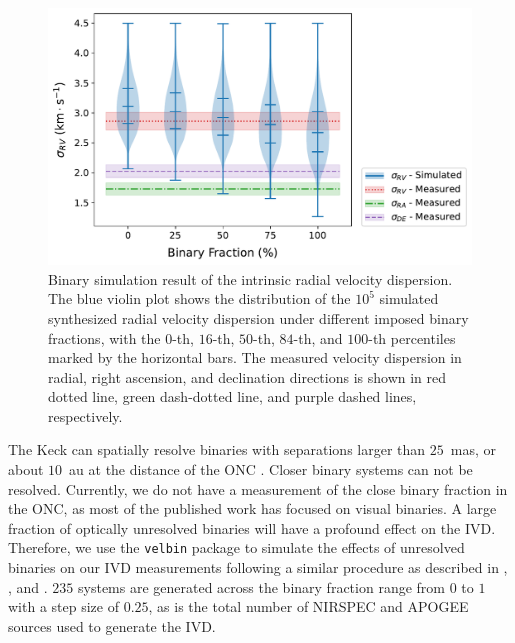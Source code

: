\documentclass[12pt]{ucsddissertation}
\begin{document}
\begin{CJK*}{UTF8}{gbsn}
\begin{figure}[htb!]
    \centering
    \includegraphics[width=\linewidth]{figures/chapter1/Binary_Simulation_Violin.pdf}
    \caption[Violin plot of the intrinsic radial velocity dispersion in binary simulation]{Binary simulation result of the intrinsic radial velocity dispersion. The blue violin plot shows the distribution of the $10^5$ simulated synthesized radial velocity dispersion under different imposed binary fractions, with the $0$-th, $16$-th, $50$-th, $84$-th, and $100$-th percentiles marked by the horizontal bars. The measured velocity dispersion in radial, right ascension, and declination directions is shown in red dotted line, green dash-dotted line, and purple dashed lines, respectively.}
    \label{fig:binary violin}
\end{figure}

The Keck can spatially resolve binaries with separations larger than $25$~mas, or about $10$~au at the distance of the ONC \citep{Lacour-2011}. Closer binary systems can not be resolved. Currently, we do not have a measurement of the close binary fraction in the ONC, as most of the published work has focused on visual binaries.  A large fraction of optically unresolved binaries will have a profound effect on the IVD. Therefore, we use the \texttt{velbin} package \citep[][]{Cottaar-2014, Foster-2015} to simulate the effects of unresolved binaries on our IVD measurements following a similar procedure as described in \citet{DaRio-2017}, \citet{Karnath-2019}, and . $235$ systems are generated across the binary fraction range from $0$ to $1$ with a step size of $0.25$, as is the total number of NIRSPEC and APOGEE sources used to generate the IVD.


\end{CJK*}
\end{document}
